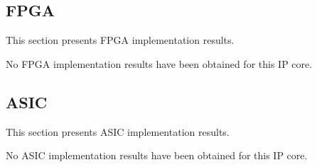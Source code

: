 \subsection{FPGA}
\ifdefined\FPGA
This section presents FPGA implementation results.

\else
No FPGA implementation results have been obtained for this IP core.
\fi


\subsection{ASIC}

\ifdefined\ASIC
This section presents ASIC implementation results.

\else
No ASIC implementation results have been obtained for this IP core.
\fi
